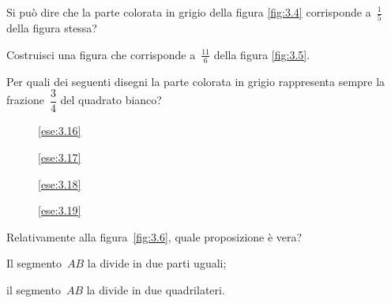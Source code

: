 \begin{esercizio}
 \label{ese:3.13}
Si può dire che la parte colorata in grigio della figura \ref{fig:3.4} corrisponde a~$\frac{1}{5}$ della figura stessa?
\end{esercizio}

\begin{esercizio}
 \label{ese:3.14}
Costruisci una figura che corrisponde a~$\frac{11}{6}$ della figura \ref{fig:3.5}.
\end{esercizio}

\begin{esercizio}
 \label{ese:3.15}
Per quali dei seguenti disegni la parte colorata in grigio rappresenta sempre la frazione~$\dfrac{3}{4}$
del quadrato bianco?
 \begin{center}
 
 \end{center}
\end{esercizio}

\begin{figure}[t]
 \begin{minipage}[b]{.20\textwidth}
 \centering
 \caption{\ref{ese:3.16}}\label{fig:3.6}
 \end{minipage}\hfil
 \begin{minipage}[b]{.20\textwidth}
 \centering 
 \caption{\ref{ese:3.17}}\label{fig:3.7}
 \end{minipage}\hfil
 \begin{minipage}[b]{.20\textwidth}
 \centering
 \caption{\ref{ese:3.18}}\label{fig:3.8}
 \end{minipage}\hfil
 \begin{minipage}[b]{.23\textwidth}
 \centering
 \caption{\ref{ese:3.19}}\label{fig:3.9}
 \end{minipage}\hfil
\end{figure}

\begin{esercizio}
\label{ese:3.16}
Relativamente alla figura~\ref{fig:3.6}, quale proposizione è vera?

\begin{enumeratea}
\item Il segmento~$AB$ la divide in due parti uguali;
\item il segmento~$AB$ la divide in due quadrilateri.
\end{enumeratea}
\end{esercizio}

